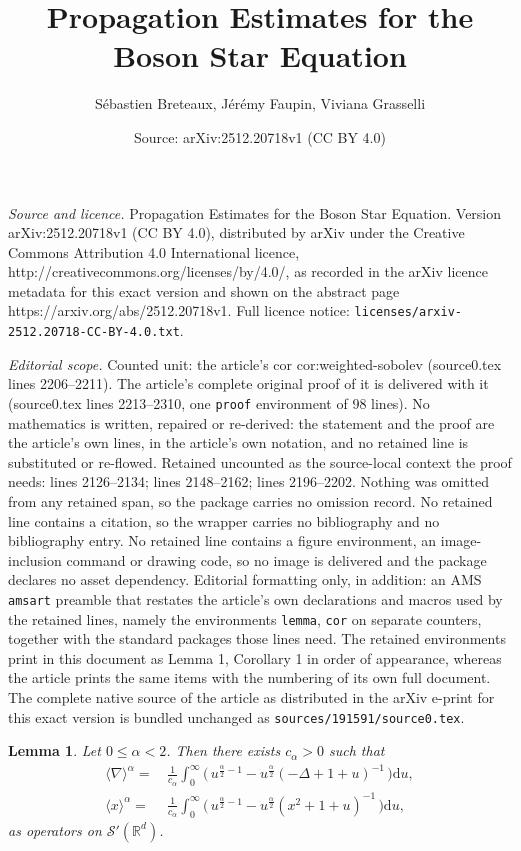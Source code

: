 \documentclass[10pt,a4paper]{amsart}
\title{Propagation Estimates for the Boson Star Equation}
\author{S\'ebastien Breteaux, J\'er\'emy Faupin, Viviana Grasselli}
\date{Source: arXiv:2512.20718v1 (CC BY 4.0)}
\newtheorem{lemma}{Lemma}
\begin{document}
\maketitle

\noindent\emph{Source and licence.} Propagation Estimates for the Boson Star Equation. Version arXiv:2512.20718v1 (CC BY 4.0), distributed by arXiv under the Creative Commons Attribution 4.0 International licence, http://creativecommons.org/licenses/by/4.0/, as recorded in the arXiv licence metadata for this exact version and shown on the abstract page https://arxiv.org/abs/2512.20718v1. Full licence notice: \texttt{licenses/arxiv-2512.20718-CC-BY-4.0.txt}.\par\smallskip

\noindent\textit{Editorial scope.} Counted unit: the article's cor cor:weighted-sobolev (source0.tex lines 2206--2211). The article's complete original proof of it is delivered with it (source0.tex lines 2213--2310, one \texttt{proof} environment of 98 lines). No mathematics is written, repaired or re-derived: the statement and the proof are the article's own lines, in the article's own notation, and no retained line is substituted or re-flowed.  Retained uncounted as the source-local context the proof needs: lines 2126--2134; lines 2148--2162; lines 2196--2202.  Nothing was omitted from any retained span, so the package carries no omission record.  No retained line contains a citation, so the wrapper carries no bibliography and no bibliography entry.  No retained line contains a figure environment, an image-inclusion command or drawing code, so no image is delivered and the package declares no asset dependency.  Editorial formatting only, in addition: an AMS \texttt{amsart} preamble that restates the article's own declarations and macros used by the retained lines, namely the environments \texttt{lemma}, \texttt{cor} on separate counters, together with the standard packages those lines need.  The retained environments print in this document as Lemma 1, Corollary 1 in order of appearance, whereas the article prints the same items with the numbering of its own full document.  The complete native source of the article as distributed in the arXiv e-print for this exact version is bundled unchanged as \texttt{sources/191591/source0.tex}.
\begin{lemma}
		\label{lemma: expr sqrt}
		Let $0\leq \alpha <2 $. Then there exists $c_\alpha>0$ such that 
		\begin{align*}
		    \langle \nabla \rangle^\alpha =&\, \frac{1}{c_\alpha} \int_0^\infty \big(\, u^{\frac\alpha2-1}- u^{\frac\alpha2} (-\Delta + 1 + u )^{-1}\, \big) \mathrm{d}u ,\\
		     \langle x \rangle^\alpha= &\,\frac{1}{c_\alpha} \int_0^\infty \big(\,u^{\frac\alpha2-1}- u^{\frac\alpha2} (x^2 +1+ u )^{-1}\, \big) \mathrm{d}u,
		\end{align*}
as operators on $\mathcal{S}'(\mathbb{R}^d)$.
	\end{lemma}
\end{document}
